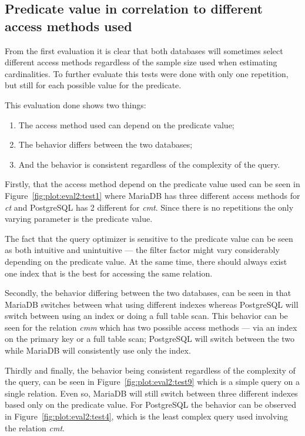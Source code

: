 \subsection{Predicate value in correlation to different access methods used}\label{sec:predicatecorrelation}
From the first evaluation it is clear that both databases will sometimes select different
access methods regardless of the sample size used when estimating cardinalities.
To further evaluate this tests were done with only one repetition, but still
for each possible value for the predicate.

This evaluation done shows two things:
\begin{enumerate}
\item The access method used can depend on the predicate value;
\item The behavior differs between the two databases;
\item And the behavior is consistent regardless of the complexity of the query.
\end{enumerate}

Firstly, that the access method depend on the predicate value used can be seen in
Figure~\ref{fig:plot:eval2:test1} where MariaDB has three different access
methods for \textit{ct} and PostgreSQL has 2 different for \textit{cmt}. Since
there is no repetitions the only varying parameter is the predicate value.

The fact that the query optimizer is sensitive to the predicate value can be seen as
both intuitive and unintuitive --- the filter factor might vary considerably
depending on the predicate value. At the same time, there should always exist
one index that is the best for accessing the same relation.

Secondly, the behavior differing between the two databases, can be seen in that
MariaDB switches between what using different indexes whereas PostgreSQL will
switch between using an index or doing a full table scan. This behavior can be
seen for the relation \textit{cmm} which has two possible access methods --- via
an index on the primary key or a full table scan; PostgreSQL will switch between
the two while MariaDB will consistently use only the index.

Thirdly and finally, the behavior being consistent regardless of the complexity
of the query, can be seen in Figure~\ref{fig:plot:eval2:test9} which is a simple
query on a single relation. Even so, MariaDB will still switch between three
different indexes based only on the predicate value. For PostgreSQL the behavior
can be observed in Figure~\ref{fig:plot:eval2:test4}, which is the least complex
query used involving the relation \textit{cmt}.

